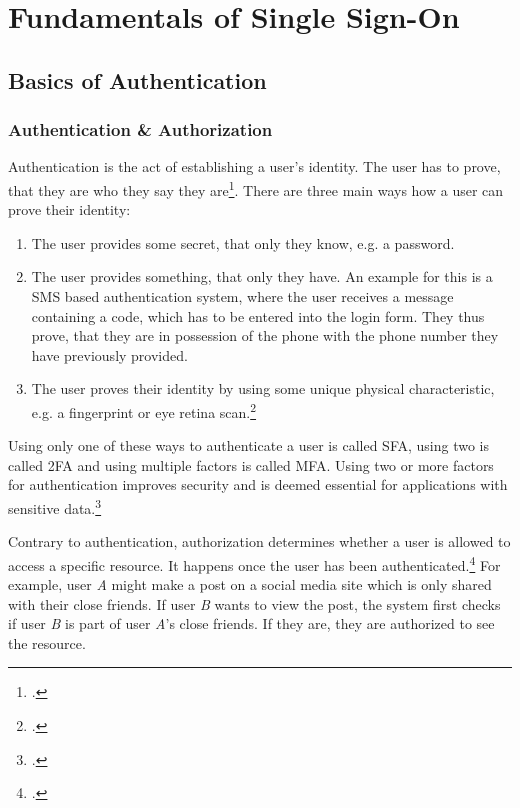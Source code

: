 \newpage
\section{Fundamentals of Single Sign-On}

\subsection{Basics of Authentication}
\subsubsection{Authentication \& Authorization}
\label{sec:authn_authz}

Authentication is the act of establishing a user's identity. The user has to prove, that they are who they say
they are\footcite[Cp.][p. 398]{Basavala2012}.
There are three main ways how a user can prove their identity:
\begin{enumerate}
    \item The user provides some secret, that only they know, e.g. a password.
    \item The user provides something, that only they have.
          An example for this is a \ac{SMS} based authentication system, where the user receives a message containing a code,
          which has to be entered into the login form. They thus prove, that they are in possession of the phone with the phone
          number they have previously provided.
    \item The user proves their identity by using some unique physical characteristic, e.g. a fingerprint or eye retina scan.\footcite[Cp.][p. 398]{Basavala2012}
\end{enumerate}
Using only one of these ways to authenticate a user is called \ac{SFA}, using two is called \ac{2FA} and using 
multiple factors is called \ac{MFA}.
Using two or more factors for authentication improves security and is deemed essential for applications with sensitive data.\footcite[Cp.][]{Drew2019}

Contrary to authentication, authorization determines whether a user is allowed to access a specific resource.
It happens once the user has been authenticated.\footcite[Cp.][]{Auth0AuthNvsAuthZ} For example, user \emph{A} might make a post on a social media site
which is only shared with their close friends. If user \emph{B} wants to view the post, the system first checks
if user \emph{B} is part of user \emph{A}'s close friends. If they are, they are authorized to see the resource.

